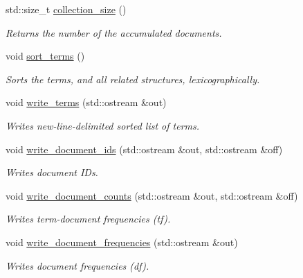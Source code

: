 \begin{DoxyCompactItemize}
std\+::size\+\_\+t \mbox{\hyperlink{classirk_1_1index__builder_a1acc084abede3f0d143448f9c0f96b7b}{collection\+\_\+size}} ()
\begin{DoxyCompactList}\small\item\em Returns the number of the accumulated documents. \end{DoxyCompactList}\item 
void \mbox{\hyperlink{classirk_1_1index__builder_ad89b04727675b0fc56e91bbe9114e942}{sort\+\_\+terms}} ()
\begin{DoxyCompactList}\small\item\em Sorts the terms, and all related structures, lexicographically. \end{DoxyCompactList}\item 
void \mbox{\hyperlink{classirk_1_1index__builder_a7bd993ab3ceb6527e622187bde86c93a}{write\+\_\+terms}} (std\+::ostream \&out)
\begin{DoxyCompactList}\small\item\em Writes new-\/line-\/delimited sorted list of terms. \end{DoxyCompactList}\item 
void \mbox{\hyperlink{classirk_1_1index__builder_adcb91466aff37e3fe77b400bffdadfbe}{write\+\_\+document\+\_\+ids}} (std\+::ostream \&out, std\+::ostream \&off)
\begin{DoxyCompactList}\small\item\em Writes document I\+Ds. \end{DoxyCompactList}\item 
void \mbox{\hyperlink{classirk_1_1index__builder_a69082abb251ed664e6ba7550995c8cf6}{write\+\_\+document\+\_\+counts}} (std\+::ostream \&out, std\+::ostream \&off)
\begin{DoxyCompactList}\small\item\em Writes term-\/document frequencies (tf). \end{DoxyCompactList}\item 
void \mbox{\hyperlink{classirk_1_1index__builder_a10f84fb4c00cea77259d275fc47635ed}{write\+\_\+document\+\_\+frequencies}} (std\+::ostream \&out)
\begin{DoxyCompactList}\small\item\em Writes document frequencies (df). \end{DoxyCompactList}\end{DoxyCompactItemize}
